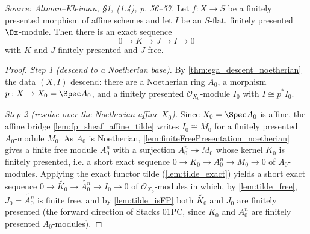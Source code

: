 \begin{lemma}
  \label{lem:free_resolution_step}
  \textit{Source: Altman--Kleiman, §1, (1.4), p. 56--57.}
  Let $f : X \to S$ be a finitely presented morphism of affine schemes and let
  $I$ be an $S$-flat, finitely presented $\Ox$-module. Then there is an exact
  sequence
  \[
    0 \to K \to J \to I \to 0
    \tag{1.4.1}
  \]
  with $K$ and $J$ finitely presented and $J$ free.
  \begin{proof}
    \emph{Step 1 (descend to a Noetherian base).} By
    \cref{thm:ega_descent_noetherian} the data $(X, I)$ descend: there are a
    Noetherian ring $A_0$, a morphism $p : X \to X_0 = \Spec A_0$, and a finitely
    presented $\mathcal{O}_{X_0}$-module $I_0$ with $I \cong p^* I_0$.

    \emph{Step 2 (resolve over the Noetherian affine $X_0$).} Since $X_0 = \Spec
    A_0$ is affine, the affine bridge \cref{lem:fp_sheaf_affine_tilde} writes
    $I_0 \cong \widetilde{M_0}$ for a finitely presented $A_0$-module $M_0$. As
    $A_0$ is Noetherian, \cref{lem:finiteFreePresentation_noetherian} gives a
    finite free module $A_0^n$ with a surjection $A_0^n \twoheadrightarrow M_0$
    whose kernel $K_0$ is finitely presented, i.e. a short exact sequence
    $0 \to K_0 \to A_0^n \to M_0 \to 0$ of $A_0$-modules. Applying the exact
    functor tilde (\cref{lem:tilde_exact}) yields a short exact sequence
    $0 \to \widetilde{K_0} \to \widetilde{A_0^n} \to I_0 \to 0$ of
    $\mathcal{O}_{X_0}$-modules in which, by \cref{lem:tilde_free},
    $J_0 = \widetilde{A_0^n}$ is finite free, and by \cref{lem:tilde_isFP} both
    $\widetilde{K_0}$ and $J_0$ are finitely presented (the forward direction of
    Stacks 01PC, since $K_0$ and $A_0^n$ are finitely presented $A_0$-modules).


\end{proof}
\end{lemma}
